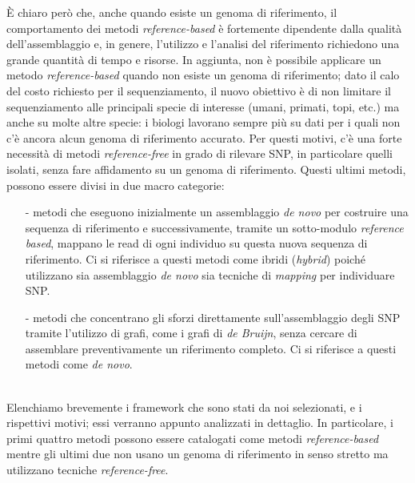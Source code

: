 \documentclass[../main.tex]{subfiles}
\begin{document}
È chiaro però che, anche quando esiste un genoma di riferimento, il comportamento dei metodi \textit{reference-based} è fortemente dipendente dalla qualità dell'assemblaggio e, in genere, l'utilizzo e l'analisi del riferimento richiedono una grande quantità di tempo e risorse. In aggiunta, non è possibile applicare un metodo \textit{reference-based} quando non esiste un genoma di riferimento; dato il calo del costo richiesto per il sequenziamento, il nuovo obiettivo è di non limitare il sequenziamento alle principali specie di interesse (umani, primati, topi, etc.) ma anche su molte altre specie: i biologi lavorano sempre più su dati per i quali non c'è ancora alcun genoma di riferimento accurato. Per questi motivi, c'è una forte necessità di metodi \textit{reference-free} in grado di rilevare SNP, in particolare quelli isolati, senza fare affidamento su un genoma di riferimento. Questi ultimi metodi, possono essere divisi in due macro categorie:
\begin{itemize} 
\item[-] metodi che eseguono inizialmente un assemblaggio \textit{de novo} per costruire una sequenza di riferimento e successivamente, tramite un sotto-modulo \textit{reference based}, mappano le read di ogni individuo su questa nuova sequenza di riferimento. Ci si riferisce a questi metodi come ibridi (\textit{hybrid}) poiché utilizzano sia assemblaggio \textit{de novo} sia tecniche di \textit{mapping} per individuare SNP.
\item[-] metodi che concentrano gli sforzi direttamente sull'assemblaggio degli SNP tramite l'utilizzo di grafi, come i grafi di \textit{de Bruijn}, senza cercare di assemblare preventivamente un riferimento completo. Ci si riferisce a questi metodi come \textit{de novo}.
\end{itemize}

\noindent
\\Elenchiamo brevemente i framework che sono stati da noi selezionati, e i rispettivi motivi; essi verranno appunto analizzati in dettaglio. In particolare, i primi quattro metodi possono essere catalogati come metodi \textit{reference-based} mentre gli ultimi due non usano un genoma di riferimento in senso stretto ma utilizzano tecniche \textit{reference-free}.
\end{document}
